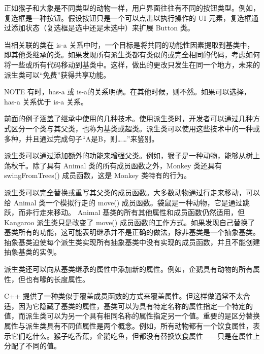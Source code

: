 
正如猴子和大象是不同类型的动物一样，用户界面往往有不同的按钮类型。例如，复选框是一种按钮。假设按钮只是一个可以点击以执行操作的 UI 元素，复选框通过添加状态（复选框是选中还是未选中）来扩展 Button 类。

当相关联的类在 is-a 关系中时，一个目标是将共同的功能性因素提取到基类中，即其他类继承的类。如果发现所有派生类都有类似的或完全相同的代码，考虑如何将一些或所有代码移动到基类中。这样，做出的更改只发生在同一个地方，未来的派生类可以“免费”获得共享功能。

\begin{myNotic}{NOTE}
有时，has-a 或 is-a的关系明确。在其他时候，则不然。如果可以选择，has-a 关系优于 is-a 关系。
\end{myNotic}


前面的例子涵盖了继承中使用的几种技术。使用派生类时，开发者可以通过几种方式区分一个类与其父类，也称为基类或超类。派生类可以使用这些技术中的一种或多种，并且通过完成句子“A是B，则……”来鉴别。


派生类可以通过添加额外的功能来增强父类。例如，猴子是一种动物，能够从树上荡秋千。除了具有 Animal 类的所有成员函数之外，Monkey 类还具有 swingFromTrees() 成员函数，这是 Monkey 类特有的行为。


派生类可以完全替换或重写其父类的成员函数。大多数动物通过行走来移动，可以给 Animal 类一个模拟行走的 move() 成员函数。袋鼠是一种动物，它是通过跳跃，而非行走来移动。 Animal 基类的所有其他属性和成员函数仍然适用，但 Kangaroo 派生类只是改变了 move() 成员函数的工作方式。如果发现自己替换了基类所有的功能，这可能表明继承并不是正确的做法，除非基类是一个抽象基类。抽象基类迫使每个派生类实现所有抽象基类中没有实现的成员函数，并且不能创建抽象基类的实例。


派生类还可以向从基类继承的属性中添加新的属性。例如，企鹅具有动物的所有属性，但也有喙的长度属性。


C++ 提供了一种类似于覆盖成员函数的方式来覆盖属性。但这样做通常不太合适，因为它隐藏了基类的属性，基类可以为具有特定名称的属性指定一个特定的值，而派生类可以为另一个具有相同名称的属性指定另一个值。重要的是区分替换属性与派生类具有不同值属性是两个概念。例如，所有动物都有一个饮食属性，表示它们吃什么。猴子吃香蕉，企鹅吃鱼，但都没有替换饮食属性——只是在属性上分配了不同的值。

